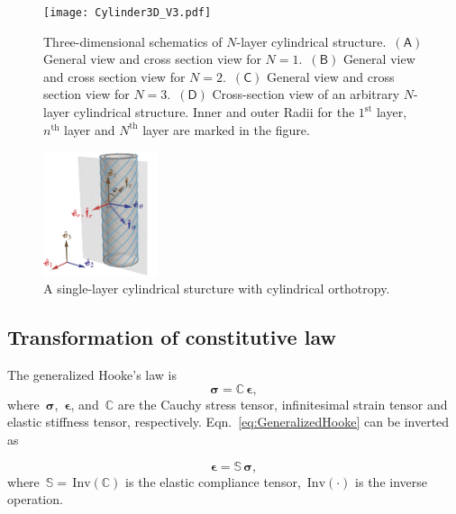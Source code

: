\documentclass[preprint,10pt,times]{elsarticle}
\numberwithin{equation}{section}
\renewcommand{\u}[1]{\boldsymbol{#1}}
\newcommand{\pr}[1]{\left( #1 \right)}
\newcommand{\Inv}{\,\mathrm{Inv}}
\newcommand{\subf}[1]{\pr{\textsf{#1}}}
\renewcommand{\>}{$\Rightarrow$}
\begin{document}
\begin{figure}[t]
  \centering
  \graphicspath{{../LyxFiles/figure/}}
  \texttt{[image: Cylinder3D\_V3.pdf]}
  \caption{Three-dimensional schematics of  $N$-layer cylindrical structure.~$\subf{A}$ General view and cross section view for $N = 1$.~$\subf{B}$ General view and cross section view for $N = 2$.~$\subf{C}$ General view and cross section view for $N = 3$.~$\subf{D}$ Cross-section view of an arbitrary $N$-layer cylindrical structure. Inner and outer Radii for the $1^\text{st}$ layer, $n^\text{th}$ layer and $N^\text{th}$ layer are marked in the figure.}
  \label{fig:Cylinder3D}
\end{figure}


\begin{figure}[t]
	\centering
	\graphicspath{{../LyxFiles/figure/}}
	\includegraphics[width=0.3\textwidth]{schematic_V4.pdf}
	\caption{A single-layer cylindrical sturcture with cylindrical orthotropy.
  }
	\label{fig:schematic}
\end{figure}

\subsection{Transformation of constitutive law}
\label{sec:MatrixTrans}
The generalized Hooke's law is
\begin{equation}
\u{\sigma} = \mathbb{C}\, \u{\epsilon},
\label{eq:GeneralizedHooke}
\end{equation}
where~$\u{\sigma}$,~$\u{\epsilon}$, and~$\mathbb{C}$ are the Cauchy stress tensor, infinitesimal strain tensor and elastic stiffness tensor, respectively. Eqn.~\eqref{eq:GeneralizedHooke} can be inverted as

\begin{equation}
 \u{\epsilon} = \mathbb{S}\, \u{\sigma},
\label{eq:GeneralizedHookeInverse}
\end{equation}
where~$\mathbb{S} = \Inv\pr{\mathbb{C}}$ is the elastic compliance tensor, $\Inv\pr{\cdot}$ is the inverse operation.
\end{document}
